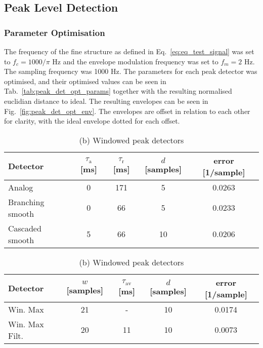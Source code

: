 \documentclass[../main2.tex]{subfiles}
\begin{document}
\subsection{Peak Level Detection}

\subsubsection{Parameter Optimisation}
The frequency of the fine structure as defined in Eq.~\eqref{eq:eq_test_signal} was set to $f_c = 1000/ \pi$ Hz and the envelope modulation frequency was set to $f_m = 2$ Hz. The sampling frequency was 1000 Hz. The parameters for each peak detector was optimised, and their optimised values can be seen in Tab.~\ref{tab:peak_det_opt_params} together with the resulting normalised euclidian distance to ideal. The resulting envelopes can be seen in Fig.~\ref{fig:peak_det_opt_env}. The envelopes are offset in relation to each other for clarity, with the ideal envelope dotted for each offset. 

\begin{table}[h]
\begin{center}
\caption{Optimised parameters for the various peak detectors, $f_c=1000/\pi $, $f_m=2 $}
\label{tab:peak_det_opt_params}
\caption*{(a) Attack and release peak detectors}
\begin{tabular}{| l | c c c | c |}
	\hline
	Detector 	& $\tau_\text{a}$ [ms] & $\tau_\text{r}$ [ms] & $d$ [samples] & error [1/sample]\\
	\hline
	
	Analog 			& 0 			& 171 	& 5		& 0.0263	\\ 
	Branching smooth 	& 0	 		& 66 	& 5		& 0.0233	\\ 
	Cascaded smooth	& 5			& 66 	& 10		& 0.0206	\\
	\hline
\end{tabular}
\end{center}

\begin{center}
\caption*{(b) Windowed peak detectors}
\label{tab:peak_det_instatt_opt_params}
 \begin{tabular}{| l | c c c | c |}
	\hline
	Detector & $w$ [samples] & $\tau_\text{av}$ [ms] & $d$ [samples] & error [1/sample] \\
	\hline
	Win. Max		& 21		& -		& 10		& 0.0174	\\ 
	Win. Max Filt.	& 20		& 11		& 10		& 0.0073	\\
	\hline
\end{tabular}
\end{center}

\end{table}
\end{document}
